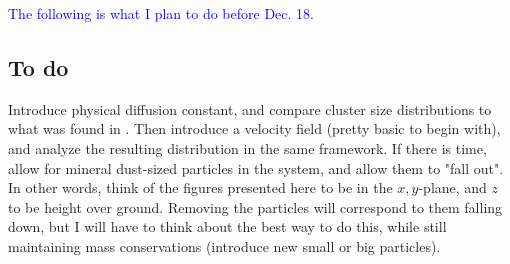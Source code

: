 \textcolor{blue}{The following is what I plan to do before Dec. 18.}

\subsection{To do}

Introduce physical diffusion constant, and compare cluster size distributions to what was found in \cite{PhysRevLett.52.1669}. Then introduce a velocity field (pretty basic to begin with), and analyze the resulting distribution in the same framework. If there is time, allow for mineral dust-sized particles in the system, and allow them to "fall out". In other words, think of the figures presented here to be in the $x,y$-plane, and $z$ to be height over ground. Removing the particles will correspond to them falling down, but I will have to think about the best way to do this, while still maintaining mass conservations (introduce new small or big particles).